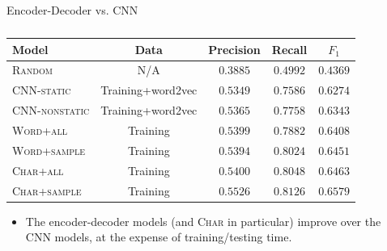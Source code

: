 \documentclass[final]{beamer}
\newlength{\sepwid}
\newlength{\onecolwid}
\newlength{\twocolwid}
\begin{document}
\begin{frame}[t]
\begin{columns}[t]
    \begin{column}{\sepwid}\end{column}			%
    \begin{column}{\twocolwid}							%
      \begin{columns}[t,totalwidth=\twocolwid]	%
        \begin{column}{\onecolwid}\vspace{-.69in}
            \begin{block}{Encoder-Decoder vs. CNN}
                \begin{table}[ht!]
                    \centering
                    \small
                    \begin{tabular}{lcccc}
                    \toprule
                    Model & Data & Precision & Recall & $F_1$ \\
                    \midrule
                    \textsc{Random} & N/A & $0.3885$ & $0.4992$ & $0.4369$ \\
                    \midrule
                    \textsc{CNN-static} & Training+word2vec & $0.5349$ & $0.7586$ & $0.6274$ \\
                    \textsc{CNN-nonstatic} & Training+word2vec & $0.5365$ & $0.7758$ & $0.6343$ \\
                    \midrule
                    \textsc{Word+all} & Training & $0.5399$ & $0.7882$ & $0.6408$ \\
                    \textsc{Word+sample} & Training & $0.5394$ & $0.8024$ & $0.6451$ \\
                    \textsc{Char+all} & Training & $0.5400$ & $0.8048$ & $0.6463$ \\
                    \textsc{Char+sample} & Training & $0.5526$ & $0.8126$ & $0.6579$ \\
                    \bottomrule
                    \end{tabular}
                    \caption{}
                    \label{tab:dev-results}
                \end{table}
                \begin{itemize}
                    \item The encoder-decoder models (and \textsc{Char} in particular) improve over the CNN models, at the expense of training/testing time.

\end{itemize}
\end{block}
\end{column}
\end{columns}
\end{column}
\end{columns}
\end{frame}
\end{document}
